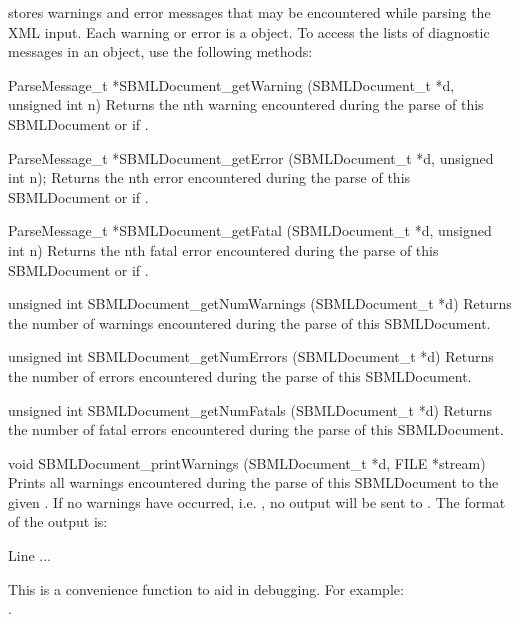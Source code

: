 \documentclass{sbmlmanual}
\begin{document}
\libsbml{} stores warnings and error messages that may be encountered while
parsing the XML input.  Each warning or error is a 
object.  To access the lists of diagnostic messages in an
 object, use the following methods:


\begin{methoddef}{ParseMessage\_t *SBMLDocument\_getWarning
(SBMLDocument\_t *d, unsigned int n)}
   Returns the nth warning encountered during the parse of this
   SBMLDocument or  if .
 \end{methoddef}

\begin{methoddef}{ParseMessage\_t *SBMLDocument\_getError (SBMLDocument\_t *d,
unsigned int n);}
   Returns the nth error encountered during the parse of this
   SBMLDocument or  if .
 \end{methoddef}

\begin{methoddef}{ParseMessage\_t *SBMLDocument\_getFatal (SBMLDocument\_t *d,
unsigned int n)}
   Returns the nth fatal error encountered during the parse of this
   SBMLDocument or  if .
 \end{methoddef}


\begin{methoddef}{unsigned int SBMLDocument\_getNumWarnings
(SBMLDocument\_t *d)}
   Returns the number of warnings encountered during the parse of this
   SBMLDocument.
 \end{methoddef}

\begin{methoddef}{unsigned int SBMLDocument\_getNumErrors (SBMLDocument\_t *d)}
   Returns the number of errors encountered during the parse of this
   SBMLDocument.
 \end{methoddef}

\begin{methoddef}{unsigned int SBMLDocument\_getNumFatals (SBMLDocument\_t *d)}
   Returns the number of fatal errors encountered during the parse of this
   SBMLDocument.
 \end{methoddef}
  

\begin{methoddef}{void SBMLDocument\_printWarnings (SBMLDocument\_t *d,
FILE *stream)}
  Prints all warnings encountered during the parse of this SBMLDocument to
  the given .  If no warnings have occurred, i.e.
  , no output will be sent to
  . The format of the output is:
  \begin{cVerbatim}
      Line %
      ...
  \end{cVerbatim}
  This is a convenience function to aid in debugging.  For example:\\
  .
 \end{methoddef}
  
\end{document}
